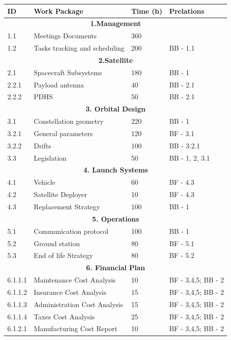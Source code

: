 \begin{longtable}{ | p{1.3cm} | p{5cm} | p{3cm} | p{3.5cm} |}
\textbf{ID }& \textbf{Work Package} & \textbf{Time (h)} & \textbf{Prelations} \\ \hline
\multicolumn{4}{|c|}{\textbf{1.Management}} \\ \hline
1.1 & Meetings Documents & 360 &   \\ \hline
1.2 & Tasks tracking and scheduling & 200 & BB - 1.1 \\ \hline
\multicolumn{4}{|c|}{\textbf{2.Satellite}} \\ \hline
2.1 & Spacecraft Subsystems & 180 & BB - 1 \\ \hline
2.2.1 & Payload antenna & 40 & BB - 2.1 \\ \hline
2.2.2 & PDHS & 50 & BB - 2.1 \\ \hline
\multicolumn{4}{|c|}{\textbf{3. Orbital Design}} \\ \hline
3.1 & Constellation geometry & 220 & BB - 1 \\ \hline
3.2.1 & General parameters & 120 & BF - 3.1 \\ \hline
3.2.2 & Drifts & 100 & BB - 3.2.1 \\ \hline
3.3 & Legislation & 50 & BB - 1, 2, 3.1\\ \hline
\multicolumn{4}{|c|}{\textbf{4. Launch Systems}} \\ \hline
4.1 & Vehicle & 60 & BF - 4.3 \\ \hline
4.2 & Satellite Deployer & 10 & BF - 4.3  \\ \hline
4.3 & Replacement Strategy & 100 & BB - 1  \\ \hline
\multicolumn{4}{|c|}{\textbf{5. Operations}} \\ \hline
5.1 & Communication protocol & 100 & BB - 1 \\ \hline
5.2 & Ground station & 80 & BF - 5.1 \\ \hline
5.3 & End of life Strategy & 80 & BF - 5.2 \\
\hline
\multicolumn{4}{|c|}{\textbf{6. Financial Plan}} \\ \hline
6.1.1.1 & Maintenance Cost Analysis & 10 & BF - 3,4,5; BB - 2 \\ \hline
6.1.1.2 & Insurance Cost Analysis & 15 & BF - 3,4,5; BB - 2  \\ \hline
6.1.1.3 & Administration Cost Analysis & 15 & BF - 3,4,5; BB - 2 \\ \hline
6.1.1.4 & Taxes Cost Analysis  & 25 & BF - 3,4,5; BB - 2 \\ \hline
6.1.2.1 & Manufacturing Cost Report & 10 & BF - 3,4,5; BB - 2 \\ \hline

\end{longtable}
